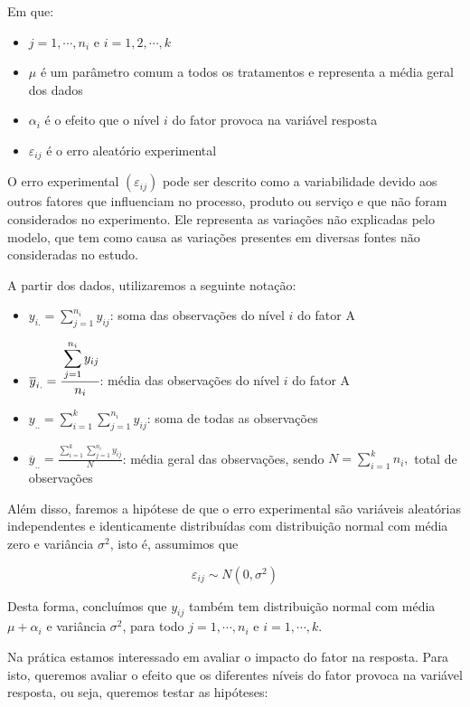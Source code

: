 \documentclass[
]{book}
\providecommand{\tightlist}{%
  \setlength{\itemsep}{0pt}\setlength{\parskip}{0pt}}
\begin{document}
Em que:

\begin{itemize}
\tightlist
\item
  \(j = 1, \cdots, n_i\) e \(i = 1,2, \cdots,k\)
\item
  \(\mu\) é um parâmetro comum a todos os tratamentos e representa a média geral dos dados
\item
  \(\alpha_{i}\) é o efeito que o nível \(i\) do fator provoca na variável resposta
\item
  \(\varepsilon_{ij}\) é o erro aleatório experimental
\end{itemize}

O erro experimental \((\varepsilon_{ij})\) pode ser descrito como a variabilidade devido aos outros fatores que influenciam no processo, produto ou serviço e que não foram considerados no experimento. Ele representa as variações não explicadas pelo modelo, que tem como causa as variações presentes em diversas fontes não consideradas no estudo.

A partir dos dados, utilizaremos a seguinte notação:

\begin{itemize}
\tightlist
\item
  \(y_{i.}=\displaystyle \sum_{j=1}^{n_{i}} y_{ij}\): soma das observações do nível \(i\) do fator A
\item
  \(\overline{y}_{i.}=\cfrac{\displaystyle\sum_{j=1}^{n_{i}} y_{ij}}{\displaystyle n_{i}}\): média das observações do nível \(i\) do fator A
\item
  \(y_{..}=\displaystyle\sum_{i=1}^{k} \sum_{j=1}^{n_{i}}y_{ij}\): soma de todas as observações
\item
  \(\overline{y}_{..}=\frac{\displaystyle \sum_{i=1}^{k}\sum_{j=1}^{n_{i}} y_{ij}}{\displaystyle N}\): média geral das observações, sendo \(N=\displaystyle\sum^{k}_{i=1}n_{i},\) total de observações
\end{itemize}

Além disso, faremos a hipótese de que o erro experimental são variáveis aleatórias independentes e identicamente distribuídas com distribuição normal com média zero e variância \(\sigma^2\), isto é, assumimos que

\[\varepsilon_{ij} \sim N(0, \sigma^2)\]

Desta forma, concluímos que \(y_{ij}\) também tem distribuição normal com média \(\mu + \alpha_i\) e variância \(\sigma^2\), para todo \(j=1, \cdots, n_i\) e \(i=1, \cdots, k\).

Na prática estamos interessado em avaliar o impacto do fator na resposta. Para isto, queremos avaliar o efeito que os diferentes níveis do fator provoca na variável resposta, ou seja, queremos testar as hipóteses:
\end{document}
